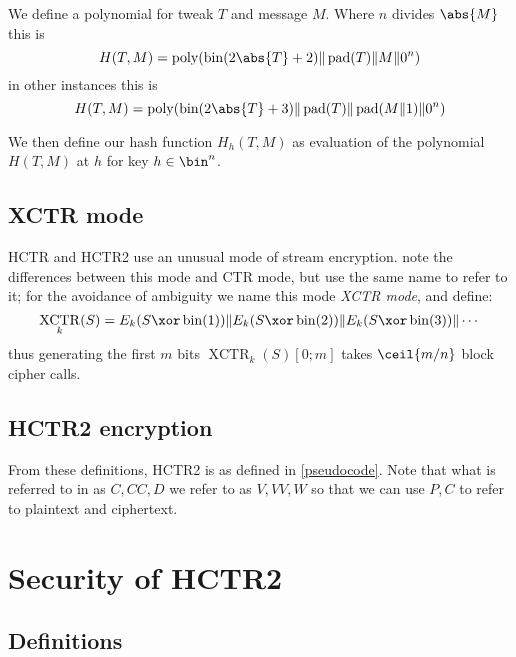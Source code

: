 \documentclass[letterpaper,11pt]{article}
\newcommand*{\Concat}{\Vert}
\DeclareMathOperator{\fromint}{bin}
\DeclareMathOperator{\pad}{pad}
\DeclareMathOperator{\poly}{poly}
\DeclareMathOperator{\XCTR}{XCTR}
\begin{document}
We define a polynomial for tweak \(T\) and message \(M\). Where \(n\) divides
\(\abs{M}\) this is
\begin{displaymath}
    H(T, M) = \poly(\fromint(2\abs{T} + 2) \Concat \pad(T) \Concat M \Concat 0^n)
\end{displaymath}
in other instances this is
\begin{displaymath}
    H(T, M) = \poly(\fromint(2\abs{T} + 3) \Concat \pad(T) \Concat \pad(M \Concat 1) \Concat 0^n)
\end{displaymath}

We then define our hash function \(H_h(T, M)\) as evaluation
of the polynomial \(H(T, M)\) at \(h\) for key \(h \in \bin^n\).

\subsection{XCTR mode}

HCTR and HCTR2 use an unusual mode of stream encryption.
\cite{hctr,hctrquad} note the differences between this mode and CTR mode,
but use the same name to refer to it; for the avoidance of ambiguity
we name this mode \emph{XCTR mode}, and define:
\begin{displaymath}
    \XCTR_k(S) = E_k(S \xor \fromint(1)) \Concat E_k(S \xor \fromint(2)) \Concat E_k(S \xor \fromint(3)) \Concat \cdots
\end{displaymath}
thus generating the first \(m\) bits \(\XCTR_k(S)[0; m]\) takes \(\ceil{m/n}\) block cipher calls.

\subsection{HCTR2 encryption}

From these definitions, HCTR2 is as defined in \autoref{pseudocode}.
Note that what is referred to in \cite{hctr,hctrquad} as \(C, \mathit{CC}, D\)
we refer to as \(V, VV, W\)
so that we can use \(P, C\) to refer to plaintext and ciphertext.

\section{Security of HCTR2}

\subsection{Definitions}
\end{document}
